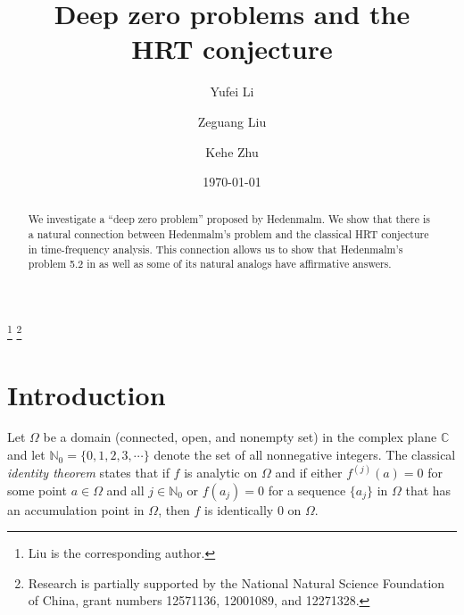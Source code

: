 \documentclass[reqno,11pt]{amsart}
\newcommand{\C}{\mathbb C}
\newcommand{\N}{\mathbb N}
\begin{document}
\title[Deep zero problems and the HRT conjecture]
{Deep zero problems and the\\ HRT conjecture}

\author{Yufei Li}
\address{School of Mathematics and Statistics, Northeast Normal University, 
Changchun, Jilin 130024, China}

\author{Zeguang Liu}
\address{School of Mathematics and Statistics, Northeast Normal University, 
Changchun, Jilin 130024, China}

\author{Kehe Zhu}
\address{Department of Mathematics and Statistics, SUNY, Albany, NY 12222, USA}



\date{\today}

\thanks{Liu is the corresponding author.}
\thanks{Research is partially supported by the National Natural Science Foundation 
of China, grant numbers 12571136, 12001089, and 12271328.}


\begin{abstract}
We investigate a ``deep zero problem'' proposed by Hedenmalm. We show that
there is a natural connection between Hedenmalm's problem and the classical HRT
conjecture in time-frequency analysis. This connection allows us to show that 
Hedenmalm's problem 5.2 in \cite{Hed2025} as well as some of its natural analogs
have affirmative answers.  
\end{abstract}

\maketitle

\section{Introduction}

Let $\Omega$ be a domain (connected, open, and nonempty set) in the complex
plane $\C$ and let $\N_0=\{0,1,2,3,\cdots\}$ denote the set of all nonnegative
integers. The classical {\it identity theorem} states that if $f$ is analytic on
$\Omega$ and if either $f^{(j)}(a)=0$ for some point $a\in\Omega$ and all
$j\in\N_0$ or $f(a_j)=0$ for a sequence $\{a_j\}$ in $\Omega$
that has an accumulation point in $\Omega$, then $f$ is identically $0$ on
$\Omega$.
\end{document}
